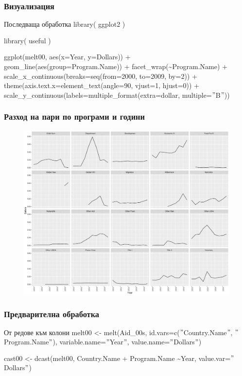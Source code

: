 \documentclass{beamer}
\begin{document}
\begin{frame}
\frametitle{Визуализация}
\begin{block}{Последваща обработка}
library( ggplot2 )

library( useful )

ggplot(melt00, aes(x=Year, y=Dollars)) + geom\_line(aes(group=Program.Name)) + facet\_wrap(\textasciitilde  Program.Name) + scale\_x\_continuous(breaks=seq(from=2000, to=2009, by=2)) + theme(axis.text.x=element\_text(angle=90, vjust=1, hjust=0)) + scale\_y\_continuous(labels=multiple\_format(extra=dollar, multiple=$"$B$"$))
\end{block}
\end{frame}

\begin{frame}
\frametitle{Разход на пари по програми и години}
\begin{figure}[]\includegraphics[width=\textwidth,height=0.75\textheight]{pic0029}\end{figure}
\end{frame}

\begin{frame}
\frametitle{Предварителна обработка}
\begin{block}{От редове към колони}
melt00 <- melt(Aid\_00s, id.vars=c($"$Country.Name$"$, $"$Program.Name$"$), variable.name=$"$Year$"$, value.name=$"$Dollars$"$)
 
cast00 <- dcast(melt00, Country.Name + Program.Name \textasciitilde Year, value.var=$"$Dollars$"$)
\end{block}
\end{frame}
\end{document}
